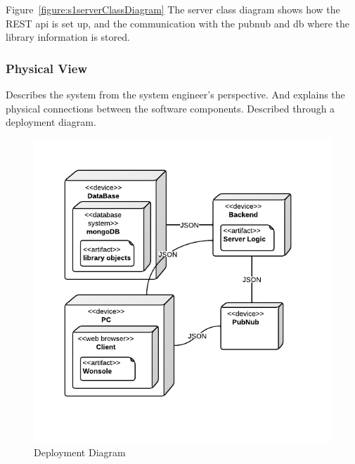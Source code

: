 Figure~\ref{figure:s1serverClassDiagram} The server class diagram shows how the REST api is set up, and the communication with the pubnub and db where the library information is stored.






\subsubsection{Physical View}
Describes the system from the system engineer's perspective. And explains the physical connections between the software components. Described through a deployment diagram. 

\begin{figure}[h]
\centering
\includegraphics[width=5in]{image/s1DeploymentDiagram.png}
\caption{Deployment Diagram}
\label{figure:s1DeploymentDiagram}
\end{figure}


